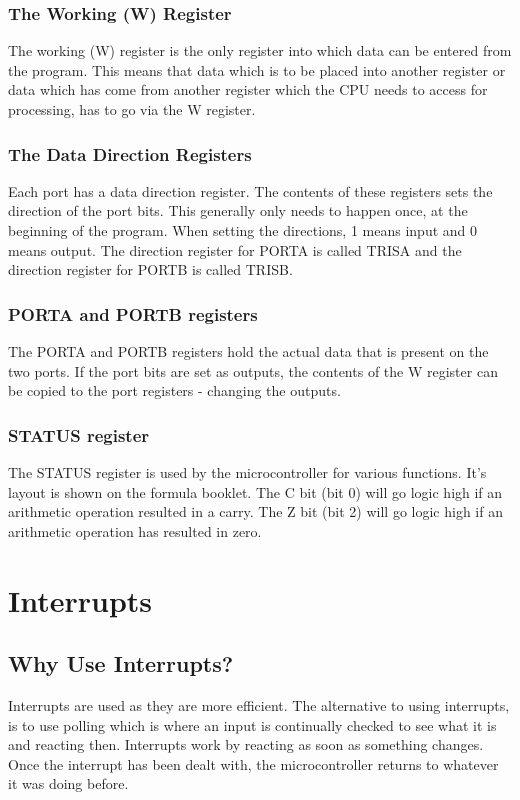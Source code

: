\documentclass[a4paper,11pt, twocolumn]{article}
\begin{document}
\subsubsection{The Working (W) Register}
The working (W) register is the only register into which data can be entered from the program. This means that data which is to be placed into another register or data which has come from another register which the CPU needs to access for processing, has to go via the W register. 
\subsubsection{The Data Direction Registers}
Each port has a data direction register. The contents of these registers sets the direction of the port bits. This generally only needs to happen once, at the beginning of the program. When setting the directions, 1 means input and 0 means output. The direction register for PORTA is called TRISA and the direction register for PORTB is called TRISB. 
\subsubsection{PORTA and PORTB registers}
The PORTA and PORTB registers hold the actual data that is present on the two ports. If the port bits are set as outputs, the contents of the W register can be copied to the port registers - changing the outputs. 
\subsubsection{STATUS register}
The STATUS register is used by the microcontroller for various functions. It's layout is shown on the formula booklet. The C bit (bit 0) will go logic high if an arithmetic operation resulted in a carry. The Z bit (bit 2) will go logic high if an arithmetic operation has resulted in zero. 

\section{Interrupts}
\subsection{Why Use Interrupts?}
Interrupts are used as they are more efficient. The alternative to using interrupts, is to use polling which is where an input is continually checked to see what it is and reacting then. Interrupts work by reacting as soon as something changes. Once the interrupt has been dealt with, the microcontroller returns to whatever it was doing before.
\end{document}
